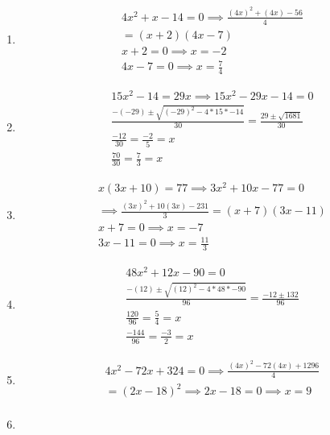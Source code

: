 \documentclass{article}
\begin{document}
\begin{enumerate}
	\item
	      \begin{align}
		      4x^2 + x - 14 = 0
		      \implies \frac{(4x)^2 + (4x) - 56}{4} \\
		      = (x + 2)(4x - 7)                     \\
		      x + 2 = 0 \implies x =  - 2           \\
		      4x - 7 = 0 \implies x = \frac{7}{4}
	      \end{align}
	\item
	      \begin{align}
		      15x^2 - 14 = 29x \implies 15x^2 - 29x - 14 = 0 \\
		      \frac{ - ( - 29) \pm \sqrt{( - 29)^2 - 4*15* - 14}}{30}
		      = \frac{29 \pm \sqrt{1681}}{30}                \\
		      \frac{ - 12}{30} = \frac{ - 2}{5} = x          \\
		      \frac{70}{30} = \frac{7}{3} = x
	      \end{align}
	\item
	      \begin{align}
		      x(3x + 10) = 77 \implies 3x^2 + 10x - 77 = 0 \\
		      \implies \frac{(3x)^2 + 10(3x) - 231}{3}
		      = (x + 7)(3x - 11)                           \\
		      x + 7 = 0 \implies x =  - 7                  \\
		      3x - 11 = 0 \implies x = \frac{11}{3}
	      \end{align}
	\item
	      \begin{align}
		      48x^2 + 12x - 90 = 0             \\
		      \frac{ - (12) \pm \sqrt{(12)^2 - 4*48* - 90}}{96}
		      = \frac{ - 12 \pm 132}{96}       \\
		      \frac{120}{96} = \frac{5}{4} = x \\
		      \frac{ - 144}{96} = \frac{ - 3}{2} = x
	      \end{align}
	\item
	      \begin{align}
		      4x^2 - 72x + 324 = 0
		      \implies \frac{(4x)^2 - 72(4x) + 1296}{4}         \\
		      = (2x - 18)^2 \implies 2x - 18 = 0 \implies x = 9 \\
	      \end{align}
	\item

\end{enumerate}
\end{document}
